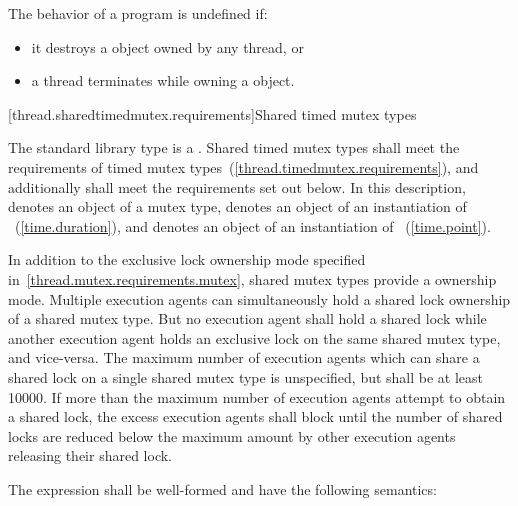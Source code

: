 \pnum
The behavior of a program is undefined if:

\begin{itemize}
\item it destroys a  object owned by any thread, or
\item a thread terminates while owning a  object.
\end{itemize}


[thread.sharedtimedmutex.requirements]{Shared timed mutex types}

\pnum
The standard library type  is a
. Shared timed mutex types shall meet the requirements of
timed mutex types~(\ref{thread.timedmutex.requirements}), and additionally
shall meet the requirements set out below. In this description, 
denotes an object of a mutex type,  denotes an object of an
instantiation of ~(\ref{time.duration}), and 
denotes an object of an instantiation of ~(\ref{time.point}).

\pnum
In addition to the exclusive lock ownership mode specified
in~\ref{thread.mutex.requirements.mutex}, shared mutex types provide a
 ownership mode. Multiple execution agents can
simultaneously hold a shared lock ownership of a shared mutex type. But no
execution agent shall hold a shared lock while another execution agent holds an
exclusive lock on the same shared mutex type, and vice-versa. The maximum
number of execution agents which can share a shared lock on a single shared
mutex type is unspecified, but shall be at least 10000. If more than the
maximum number of execution agents attempt to obtain a shared lock, the
excess execution agents shall block until the number of shared locks are
reduced below the maximum amount by other execution agents releasing their
shared lock.

\pnum
The expression  shall be well-formed and have the
following semantics:

